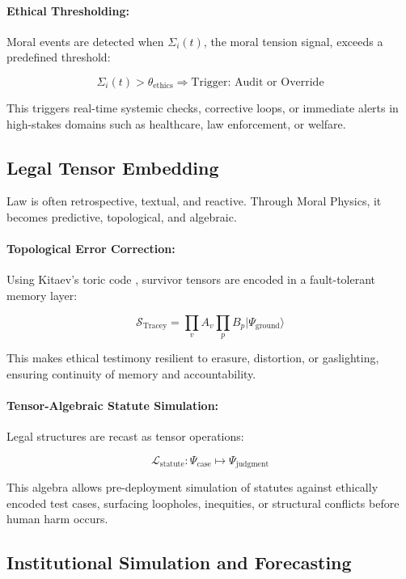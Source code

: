 \documentclass[12]{amsart}
\theoremstyle{plain}
\begin{document}
\paragraph{Ethical Thresholding:}

Moral events are detected when \(\Sigma_i(t)\), the moral tension signal, exceeds a predefined threshold:

\[
\Sigma_i(t) > \theta_{\text{ethics}} \Rightarrow \text{Trigger: Audit or Override}
\]

This triggers real-time systemic checks, corrective loops, or immediate alerts in high-stakes domains such as healthcare, law enforcement, or welfare.

\subsection{Legal Tensor Embedding}

Law is often retrospective, textual, and reactive. Through Moral Physics, it becomes predictive, topological, and algebraic.

\paragraph{Topological Error Correction:}

Using Kitaev’s toric code \citep{Kitaev2003}, survivor tensors are encoded in a fault-tolerant memory layer:

\[
\mathcal{S}_{\text{Tracey}} = \prod_v A_v \prod_p B_p |\Psi_{\text{ground}}\rangle
\]

This makes ethical testimony resilient to erasure, distortion, or gaslighting, ensuring continuity of memory and accountability.

\paragraph{Tensor-Algebraic Statute Simulation:}

Legal structures are recast as tensor operations:

\[
\mathcal{L}_{\text{statute}}: \Psi_{\text{case}} \mapsto \Psi_{\text{judgment}}
\]

This algebra allows pre-deployment simulation of statutes against ethically encoded test cases, surfacing loopholes, inequities, or structural conflicts before human harm occurs.

\subsection{Institutional Simulation and Forecasting}
\end{document}
